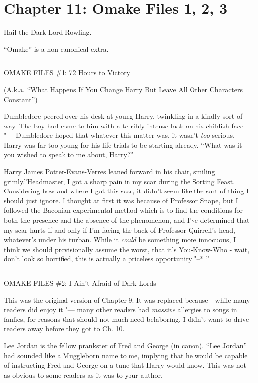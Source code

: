 \chapter{Chapter 11: Omake Files 1, 2, 3}
Hail the Dark Lord Rowling.

``Omake'' is a non-canonical extra.

\begin{center}\rule{3in}{0.4pt}\end{center}

OMAKE FILES \#1: 72 Hours to Victory

(A.k.a. ``What Happens If You Change Harry But Leave All Other
Characters Constant'')

Dumbledore peered over his desk at young Harry, twinkling in a kindly
sort of way. The boy had come to him with a terribly intense look on his
childish face "--- Dumbledore hoped that whatever this matter was, it
wasn't \emph{too} serious. Harry was far too young for his life trials
to be starting already. ``What was it you wished to speak to me about,
Harry?''

Harry James Potter-Evans-Verres leaned forward in his chair, smiling
grimly.''Headmaster, I got a sharp pain in my scar during the Sorting
Feast. Considering how and where I got this scar, it didn't seem like
the sort of thing I should just ignore. I thought at first it was
because of Professor Snape, but I followed the Baconian experimental
method which is to find the conditions for both the presence and the
absence of the phenomenon, and I've determined that my scar hurts if and
only if I'm facing the back of Professor Quirrell's head, whatever's
under his turban. While it \emph{could} be something more innocuous, I
think we should provisionally assume the worst, that it's You-Know-Who -
wait, don't look so horrified, this is actually a priceless opportunity
"--* ''

\begin{center}\rule{3in}{0.4pt}\end{center}

OMAKE FILES \#2: I Ain't Afraid of Dark Lords

This was the original version of Chapter 9. It was replaced because -
while many readers did enjoy it "--- many other readers had \emph{massive}
allergies to songs in fanfics, for reasons that should not much need
belaboring. I didn't want to drive readers away before they got to Ch.
10.

Lee Jordan is the fellow prankster of Fred and George (in canon). ``Lee
Jordan'' had sounded like a Muggleborn name to me, implying that he
would be capable of instructing Fred and George on a tune that Harry
would know. This was not as obvious to some readers as it was to your
author.

